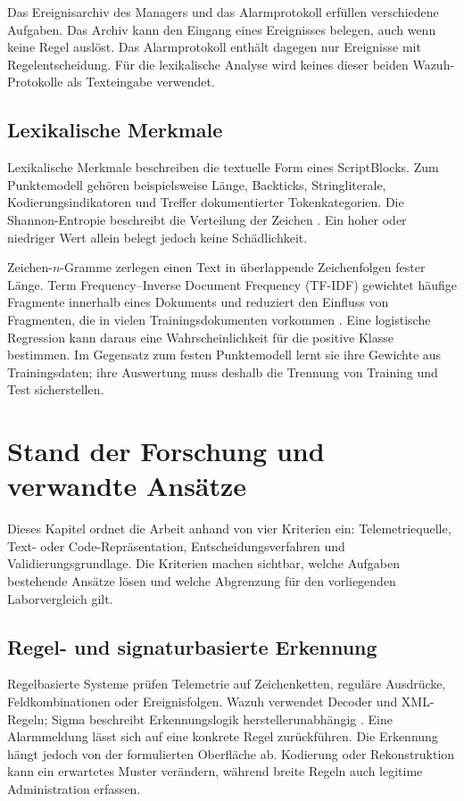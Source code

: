 \documentclass[12pt,a4paper,oneside,parskip=half]{scrreprt}
\begin{document}
Das Ereignisarchiv des Managers und das Alarmprotokoll erfüllen verschiedene Aufgaben. Das Archiv kann den Eingang eines Ereignisses belegen, auch wenn keine Regel auslöst. Das Alarmprotokoll enthält dagegen nur Ereignisse mit Regelentscheidung. Für die lexikalische Analyse wird keines dieser beiden Wazuh-Protokolle als Texteingabe verwendet.

\section{Lexikalische Merkmale}
Lexikalische Merkmale beschreiben die textuelle Form eines ScriptBlocks. Zum Punktemodell gehören beispielsweise Länge, Backticks, Stringliterale, Kodierungsindikatoren und Treffer dokumentierter Tokenkategorien. Die Shannon-Entropie beschreibt die Verteilung der Zeichen \cite{shannon1948}. Ein hoher oder niedriger Wert allein belegt jedoch keine Schädlichkeit.

Zeichen-\(n\)-Gramme zerlegen einen Text in überlappende Zeichenfolgen fester Länge. Term Frequency--Inverse Document Frequency (TF-IDF) gewichtet häufige Fragmente innerhalb eines Dokuments und reduziert den Einfluss von Fragmenten, die in vielen Trainingsdokumenten vorkommen \cite{salton1988}. Eine logistische Regression kann daraus eine Wahrscheinlichkeit für die positive Klasse bestimmen. Im Gegensatz zum festen Punktemodell lernt sie ihre Gewichte aus Trainingsdaten; ihre Auswertung muss deshalb die Trennung von Training und Test sicherstellen.
\chapter{Stand der Forschung und verwandte Ansätze}

Dieses Kapitel ordnet die Arbeit anhand von vier Kriterien ein: Telemetriequelle, Text- oder Code-Repräsentation, Entscheidungsverfahren und Validierungsgrundlage. Die Kriterien machen sichtbar, welche Aufgaben bestehende Ansätze lösen und welche Abgrenzung für den vorliegenden Laborvergleich gilt.

\section{Regel- und signaturbasierte Erkennung}
Regelbasierte Systeme prüfen Telemetrie auf Zeichenketten, reguläre Ausdrücke, Feldkombinationen oder Ereignisfolgen. Wazuh verwendet Decoder und XML-Regeln; Sigma beschreibt Erkennungslogik herstellerunabhängig \cite{wazuh-rules,sigmahq-powershell}. Eine Alarmmeldung lässt sich auf eine konkrete Regel zurückführen. Die Erkennung hängt jedoch von der formulierten Oberfläche ab. Kodierung oder Rekonstruktion kann ein erwartetes Muster verändern, während breite Regeln auch legitime Administration erfassen.
\end{document}
